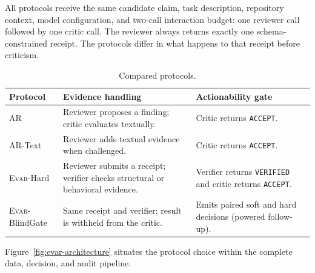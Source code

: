 \documentclass[acmsmall,screen,review,anonymous]{acmart}
\newcommand{\evar}{\textsc{Evar}\xspace}
\begin{document}
All protocols receive the same candidate claim, task description, repository context, model configuration, and two-call interaction budget: one reviewer call followed by one critic call. The reviewer always returns exactly one schema-constrained receipt. The protocols differ in what happens to that receipt before criticism.

\begin{table}[h]
\centering
\caption{Compared protocols.}
\label{tab:protocols}
\begin{tabularx}{\linewidth}{@{}lXX@{}}
\toprule
Protocol & Evidence handling & Actionability gate \\
\midrule
AR & Reviewer proposes a finding; critic evaluates textually. & Critic returns \texttt{ACCEPT}. \\
AR-Text & Reviewer adds textual evidence when challenged. & Critic returns \texttt{ACCEPT}. \\
\evar-Hard & Reviewer submits a receipt; verifier checks structural or behavioral evidence. & Verifier returns \texttt{VERIFIED} and critic returns \texttt{ACCEPT}. \\
\evar-BlindGate & Same receipt and verifier; result is withheld from the critic. & Emits paired soft and hard decisions (powered follow-up). \\
\bottomrule
\end{tabularx}
\end{table}

Figure~\ref{fig:evar-architecture} situates the protocol choice within the complete data, decision, and audit pipeline.
\end{document}
